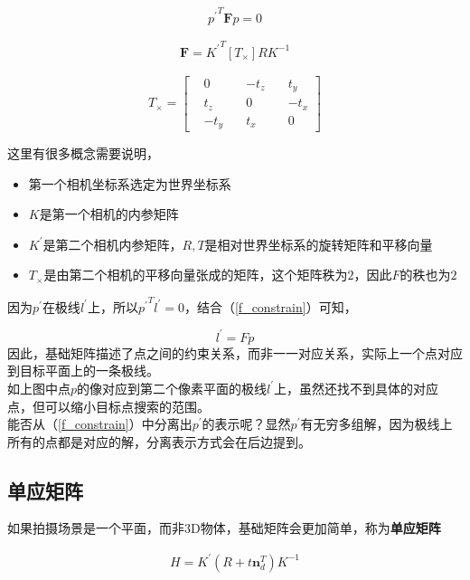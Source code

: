 \documentclass[hpyerref,UTF8,a4paper,titlepage,12pt,oneside]{ctexbook}
\theoremstyle{definition}
\begin{document}
	\begin{equation}
		{p^{\prime}}^T \mathbf{F} p = 0 \label{f_constrain}
	\end{equation}

	\begin{align}
		\mathbf{F} = {K^{\prime}}^T [T{_{\times}}] RK^{-1} \label{base_matrix}
	\end{align}

	\begin{equation}
		T_{\times} = \begin{bmatrix}
			&0 \quad &-t_z \quad & t_y\\
			&t_z \quad &0 \quad &-t_x\\
			&-t_y \quad &t_x \quad &0
		\end{bmatrix}
	\end{equation}

	这里有很多概念需要说明，
	\begin{itemize}
		\item 第一个相机坐标系选定为世界坐标系
		\item $K$是第一个相机的内参矩阵
		\item $K^{\prime}$是第二个相机内参矩阵，$R,T$是相对世界坐标系的旋转矩阵和平移向量
		\item $T_{\times}$是由第二个相机的平移向量张成的矩阵，这个矩阵秩为$2$，因此$F$的秩也为$2$
	\end{itemize}

	因为$p^{\prime}$在极线$l^{\prime}$上，所以${{p^{\prime}}^Tl^{\prime} = 0}$，结合（\ref{f_constrain}）可知，

	$$
		l^{\prime} = Fp
	$$
	因此，基础矩阵描述了点之间的约束关系，而非一一对应关系，实际上一个点对应到目标平面上的一条极线。\\

	如上图中点$p$的像对应到第二个像素平面的极线$l^{\prime}$上，虽然还找不到具体的对应点，但可以缩小目标点搜索的范围。\\

	能否从（\ref{f_constrain}）中分离出$p^{\prime}$的表示呢？显然$p^{\prime}$有无穷多组解，因为极线上所有的点都是对应的解，分离表示方式会在后边提到。

\subsection{单应矩阵}

	如果拍摄场景是一个平面，而非3D物体，基础矩阵会更加简单，称为\textbf{单应矩阵}

	\begin{align}
		H = K^{\prime} \left(R +t \mathbf{n}_d^T\right) K^{-1} \label{homograph_matrix}
	\end{align}
\end{document}
